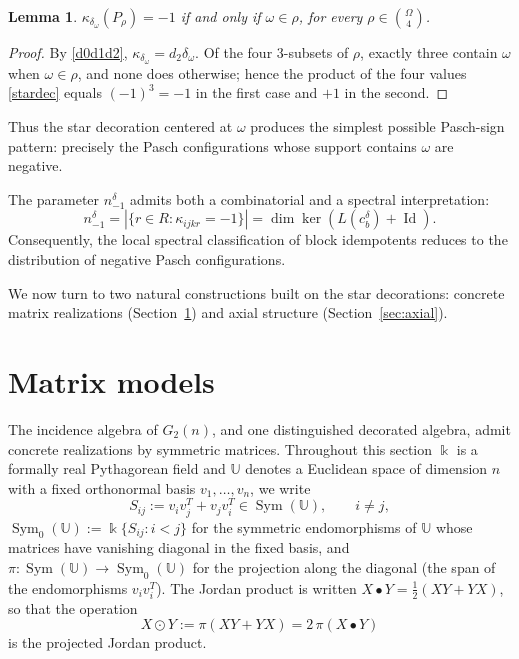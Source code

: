 \documentclass[times,11pt,reqno]{amsproc}
\newtheorem{lemma}[theorem]{Lemma}
\theoremstyle{definition}
\numberwithin{equation}{section}
\newcommand\fie{\Bbbk}
\def\ualg{\mathbb{U}}
\newcommand{\Id}{\operatorname{Id}}
\DeclareMathOperator{\Sym}{Sym}
\def\ualg{\mathbb{U}}
\begin{document}
\begin{lemma}\label{lem:starkappa}
$\kappa_{\delta_\omega}(P_\rho)=-1$ if and only if $\omega\in\rho$, for
every $\rho\in\binom{\Omega}{4}$.
\end{lemma}

\begin{proof}
By \eqref{d0d1d2}, $\kappa_{\delta_\omega}=d_2\delta_\omega$. Of the four
$3$-subsets of $\rho$, exactly three contain $\omega$ when
$\omega\in\rho$, and none does otherwise; hence the product of the four
values \eqref{stardec} equals $(-1)^3=-1$ in the first case and $+1$ in
the second.
\end{proof}


Thus the star decoration centered at $\omega$ produces the simplest possible Pasch-sign pattern: precisely the Pasch configurations whose support contains $\omega$ are negative.

The parameter $n^{\delta}_{-1}$ admits both a combinatorial and a
spectral interpretation:
$$
n^{\delta}_{-1}
=
|\{r\in R:\kappa_{ijkr}=-1\}|
=
\dim \ker (L(c_b^\delta)+\Id).
$$
Consequently, the local spectral classification of block idempotents
reduces to the distribution of negative Pasch configurations.


We now turn to two natural constructions built on the star decorations: concrete matrix realizations (Section~\ref{sec:matrixmodel}) and axial structure (Section~\ref{sec:axial}).


\section{Matrix models}\label{sec:matrixmodel}

The incidence algebra of $G_2(n)$, and one distinguished decorated
algebra, admit concrete realizations by symmetric matrices. Throughout
this section $\fie$ is a formally real Pythagorean field and $\ualg$ denotes a Euclidean space of dimension $n$ with a
fixed orthonormal basis $v_1,\dots,v_n$, we write
$$
S_{ij}:=v_iv_j^{T}+v_jv_i^{T}\in\Sym(\ualg),
\qquad
i\neq j,
$$
$\Sym_0(\ualg):=\fie\{S_{ij}:i<j\}$ for the symmetric endomorphisms of $\ualg$ whose matrices have vanishing
diagonal in the fixed basis, and $\pi:\Sym(\ualg)\to\Sym_0(\ualg)$ for the projection
along the diagonal (the span of the endomorphisms $v_{i}v_{i}^{T}$).
The Jordan product is written $X\bullet Y=\tfrac12(XY+YX)$, so that the operation
\begin{equation}\label{diamond}
X\odot Y:=\pi(XY+YX)=2\,\pi(X\bullet Y)
\end{equation}
is the projected Jordan product.
\end{document}
